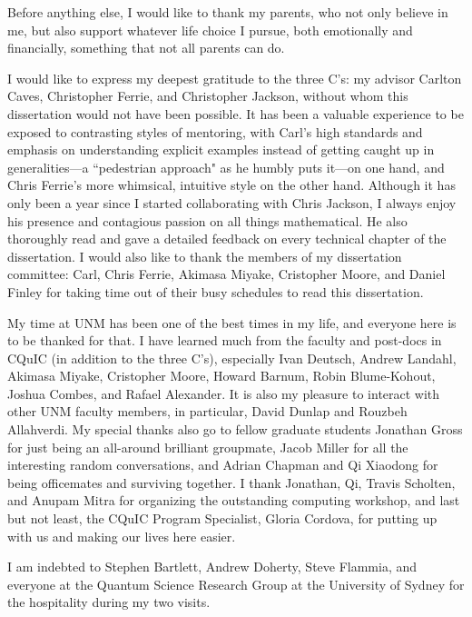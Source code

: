 \begin{acknowledgments}
Before anything else, I would like to thank my parents, who not only believe in me, but also support whatever life choice I pursue, both emotionally and financially, something that not all parents can do.

I would like to express my deepest gratitude to the three C's: my advisor Carlton Caves, Christopher Ferrie, and Christopher Jackson,
without whom this dissertation would not have been possible.  It has been a valuable experience to be exposed to contrasting styles of mentoring, with Carl's high standards and emphasis on understanding explicit examples instead of getting caught up in generalities---a ``pedestrian approach" as he humbly puts it---on one hand, and Chris Ferrie's more whimsical, intuitive style on the other hand.  Although it has only been a year since I started collaborating with Chris Jackson, I always enjoy his presence and contagious passion on all things mathematical.  He also thoroughly read and gave a detailed feedback on every technical chapter of the dissertation. I would also like to thank the members of my dissertation committee: Carl, Chris Ferrie, Akimasa Miyake, Cristopher Moore, and Daniel Finley for taking time out of their busy schedules to read this dissertation.

My time at UNM has been one of the best times in my life, and everyone here is to be thanked for that. I have learned much from the faculty and post-docs in CQuIC (in addition to the three C's), especially Ivan Deutsch, Andrew Landahl, Akimasa Miyake, Cristopher Moore, Howard Barnum, Robin Blume-Kohout, Joshua Combes, and Rafael Alexander. It is also my pleasure to interact with other UNM faculty members, in particular, David Dunlap and Rouzbeh Allahverdi. My special thanks also go to fellow graduate students Jonathan Gross for just being an all-around brilliant groupmate, Jacob Miller for all the interesting random conversations, and Adrian Chapman and Qi Xiaodong for being officemates and surviving together. I thank Jonathan, Qi, Travis Scholten, and Anupam Mitra for organizing the outstanding computing workshop, and last but not least, the CQuIC Program Specialist, Gloria Cordova, for putting up with us and making our lives here easier.

I am indebted to Stephen Bartlett, Andrew Doherty, Steve Flammia, and everyone at the Quantum Science Research Group at the University of Sydney for the hospitality during my two visits.
\end{acknowledgments} 